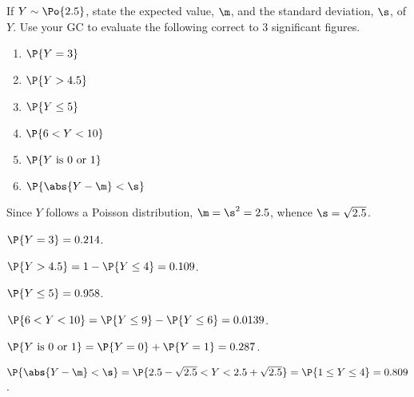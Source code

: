 \begin{problem}
    If $Y \sim \Po{2.5}$, state the expected value, $\m$, and the standard deviation, $\s$, of $Y$. Use your GC to evaluate the following correct to 3 significant figures.
    \begin{enumerate}
        \item $\P{Y = 3}$
        \item $\P{Y > 4.5}$
        \item $\P{Y \leq 5}$
        \item $\P{6 < Y < 10}$
        \item $\P{Y \text{ is 0 or 1}}$
        \item $\P{\abs{Y - \m} < \s}$
    \end{enumerate}
\end{problem}
\begin{solution}
    Since $Y$ follows a Poisson distribution, $\m = \s^2 = 2.5$, whence $\s = \sqrt{2.5}$.

    \begin{ppart}
        $\P{Y = 3} = 0.214$.
    \end{ppart}
    \begin{ppart}
        $\P{Y > 4.5} = 1- \P{Y \leq 4} = 0.109$.
    \end{ppart}
    \begin{ppart}
        $\P{Y \leq 5} = 0.958$.
    \end{ppart}
    \begin{ppart}
        $\P{6 < Y < 10} = \P{Y \leq 9} - \P{Y \leq 6} = 0.0139$.
    \end{ppart}
    \begin{ppart}
        $\P{Y \text{ is 0 or 1}} = \P{Y = 0} + \P{Y = 1} = 0.287$.
    \end{ppart}
    \begin{ppart}
        $\P{\abs{Y - \m} < \s} = \P{2.5 - \sqrt{2.5} < Y < 2.5 + \sqrt{2.5}} = \P{1 \leq Y \leq 4} = 0.809$.
    \end{ppart}
\end{solution}


